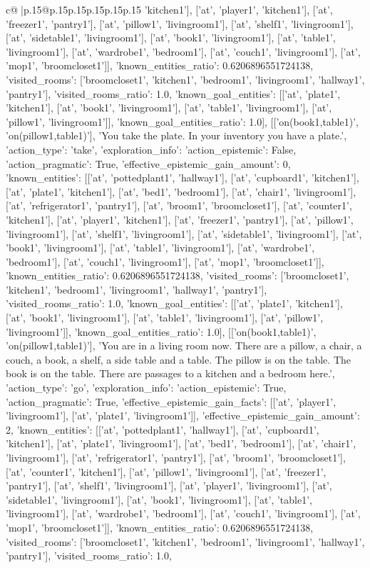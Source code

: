 \documentclass{article}
\begin{document}
{\begin{supertabular}{c@{$\;$}|p{.15\linewidth}@{}p{.15\linewidth}p{.15\linewidth}p{.15\linewidth}p{.15\linewidth}p{.15\linewidth}}
{{{'kitchen1'], ['at', 'player1', 'kitchen1'], ['at', 'freezer1', 'pantry1'], ['at', 'pillow1', 'livingroom1'], ['at', 'shelf1', 'livingroom1'], ['at', 'sidetable1', 'livingroom1'], ['at', 'book1', 'livingroom1'], ['at', 'table1', 'livingroom1'], ['at', 'wardrobe1', 'bedroom1'], ['at', 'couch1', 'livingroom1'], ['at', 'mop1', 'broomcloset1']], 'known_entities_ratio': 0.6206896551724138, 'visited_rooms': ['broomcloset1', 'kitchen1', 'bedroom1', 'livingroom1', 'hallway1', 'pantry1'], 'visited_rooms_ratio': 1.0, 'known_goal_entities': [['at', 'plate1', 'kitchen1'], ['at', 'book1', 'livingroom1'], ['at', 'table1', 'livingroom1'], ['at', 'pillow1', 'livingroom1']], 'known_goal_entities_ratio': 1.0}}], [['on(book1,table1)', 'on(pillow1,table1)'], 'You take the plate. In your inventory you have a plate.', {'action_type': 'take', 'exploration_info': {'action_epistemic': False, 'action_pragmatic': True, 'effective_epistemic_gain_amount': 0, 'known_entities': [['at', 'pottedplant1', 'hallway1'], ['at', 'cupboard1', 'kitchen1'], ['at', 'plate1', 'kitchen1'], ['at', 'bed1', 'bedroom1'], ['at', 'chair1', 'livingroom1'], ['at', 'refrigerator1', 'pantry1'], ['at', 'broom1', 'broomcloset1'], ['at', 'counter1', 'kitchen1'], ['at', 'player1', 'kitchen1'], ['at', 'freezer1', 'pantry1'], ['at', 'pillow1', 'livingroom1'], ['at', 'shelf1', 'livingroom1'], ['at', 'sidetable1', 'livingroom1'], ['at', 'book1', 'livingroom1'], ['at', 'table1', 'livingroom1'], ['at', 'wardrobe1', 'bedroom1'], ['at', 'couch1', 'livingroom1'], ['at', 'mop1', 'broomcloset1']], 'known_entities_ratio': 0.6206896551724138, 'visited_rooms': ['broomcloset1', 'kitchen1', 'bedroom1', 'livingroom1', 'hallway1', 'pantry1'], 'visited_rooms_ratio': 1.0, 'known_goal_entities': [['at', 'plate1', 'kitchen1'], ['at', 'book1', 'livingroom1'], ['at', 'table1', 'livingroom1'], ['at', 'pillow1', 'livingroom1']], 'known_goal_entities_ratio': 1.0}}], [['on(book1,table1)', 'on(pillow1,table1)'], 'You are in a living room now. There are a pillow, a chair, a couch, a book, a shelf, a side table and a table. The pillow is on the table. The book is on the table. There are passages to a kitchen and a bedroom here.', {'action_type': 'go', 'exploration_info': {'action_epistemic': True, 'action_pragmatic': True, 'effective_epistemic_gain_facts': [['at', 'player1', 'livingroom1'], ['at', 'plate1', 'livingroom1']], 'effective_epistemic_gain_amount': 2, 'known_entities': [['at', 'pottedplant1', 'hallway1'], ['at', 'cupboard1', 'kitchen1'], ['at', 'plate1', 'livingroom1'], ['at', 'bed1', 'bedroom1'], ['at', 'chair1', 'livingroom1'], ['at', 'refrigerator1', 'pantry1'], ['at', 'broom1', 'broomcloset1'], ['at', 'counter1', 'kitchen1'], ['at', 'pillow1', 'livingroom1'], ['at', 'freezer1', 'pantry1'], ['at', 'shelf1', 'livingroom1'], ['at', 'player1', 'livingroom1'], ['at', 'sidetable1', 'livingroom1'], ['at', 'book1', 'livingroom1'], ['at', 'table1', 'livingroom1'], ['at', 'wardrobe1', 'bedroom1'], ['at', 'couch1', 'livingroom1'], ['at', 'mop1', 'broomcloset1']], 'known_entities_ratio': 0.6206896551724138, 'visited_rooms': ['broomcloset1', 'kitchen1', 'bedroom1', 'livingroom1', 'hallway1', 'pantry1'], 'visited_rooms_ratio': 1.0, }}}
\end{supertabular}}
\end{document}
